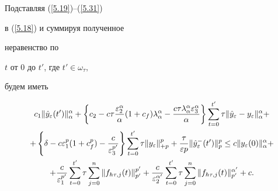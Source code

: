 \begin{pf}
\begin{equation}
\end{equation}


Подставляя (\ref{5.19})--(\ref{5.31})


в (\ref{5.18}) и суммируя полученное


неравенство по


$t$ от $0 $ до $t'$, где $t' \in \omega_\tau, $


будем иметь


\begin{gather}


 c_{1}


\| \Hat{y}_\varepsilon (t') \|^{\alpha}_{\alpha}


+


\left\{ c_{2} - c\tau\frac{\varepsilon^{\alpha}_{2}}{\alpha}


 ( 1+c_f)\lambda ^{\alpha }_{\alpha } -


 \frac{c\tau\lambda^{\alpha}_{\alpha}\varepsilon^{\alpha}_{3}}


 {\alpha} \right\}


\sum^{t'}_{t=0}\tau \|  \Hat{y}_\varepsilon - y_\varepsilon


\| ^{\alpha}_{\alpha } +\notag \\


%


+ \left\{ \delta - c\varepsilon^{p}_{1}(1+ c_f^p)


 - \frac{c}{\varepsilon^{p'}_{3}}


\right\} \sum^{t'}_{t=0}\tau


\|  y_\varepsilon \| ^{p}_{+p}+


\frac{\tau}{\varepsilon p}


\| \Hat{y}_\varepsilon^{-} (t') \|^p_p \le


c\| y_\varepsilon(0) \|^{\alpha}_{\alpha} +\notag\\


%


+


\frac{c}{\varepsilon^{p'}_{1} }


\sum^{t'}_{t=0}\tau \sum^{n}_{j=0}


\|  f_{h\tau,j}(t) \| ^{p'}_{p'} +


\frac{c}{\varepsilon^{\alpha '}_{2} }


\sum^{t'}_{t=0}\tau\sum^{n}_{j=0}\| f_{h\tau,j}(t)


\| ^{\alpha '}_{p'} + c. \label{5.32}


\end{gather}



\end{pf}
